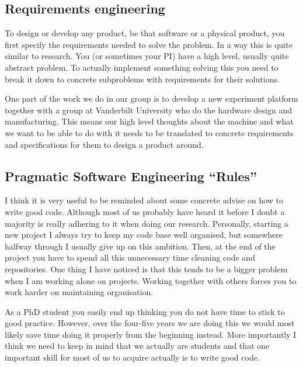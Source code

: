 \documentclass[11pt]{article}
\begin{document}
\subsection*{Requirements engineering}
To design or develop any product, be that software or a physical product, you first specify the requirements needed to solve the problem. In a way this is quite similar to research. You (or sometimes your PI) have a high level, usually quite abstract problem. To actually implement something solving this you need to break it down to concrete subproblems with requirements for their solutions.

One part of the work we do in our group is to develop a new experiment platform together with a group at Vanderbilt University who do the hardware design and manufacturing. This means our high level thoughts about the machine and what we want to be able to do with it needs to be translated to concrete requirements and specifications for them to design a product around.

\subsection*{Pragmatic Software Engineering ``Rules''}
I think it is very useful to be reminded about some concrete advise on how to write good code. Although most of us probably have heard it before I doubt a majority is really adhering to it when doing our research. Personally, starting a new project I always try to keep my code base well organised, but somewhere halfway through I usually give up on this ambition. Then, at the end of the project you have to spend all this unnecessary time cleaning code and repositories. One thing I have noticed is that this tends to be a bigger problem when I am working alone on projects. Working together with others forces you to work harder on maintaining organisation.

As a PhD student you easily end up thinking you do not have time to stick to good practice. However, over the four-five years we are doing this we would most likely save time doing it properly from the beginning instead. More importantly I think we need to keep in mind that we actually are students and that one important skill for most of us to acquire actually is to write good code.

\end{document}
